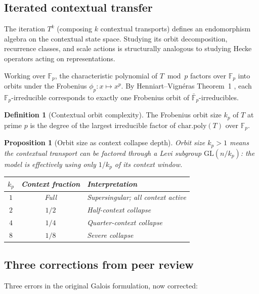 \documentclass[11pt]{amsart}
\newtheorem{proposition}[theorem]{Proposition}
\theoremstyle{definition}
\newtheorem{definition}[theorem]{Definition}
\newcommand{\Fp}{\mathbb{F}_p}
\newcommand{\Fbar}{\bar{\mathbb{F}}_p}
\begin{document}
\subsection{Iterated contextual transfer}

The iteration $T^k$ (composing $k$ contextual transports)
defines an endomorphism algebra on the contextual state space.
Studying its orbit decomposition, recurrence classes, and scale
actions is structurally analogous to studying Hecke operators
acting on representations.

Working over $\Fp$, the characteristic polynomial of $T \bmod p$
factors over $\Fp$ into orbits under the Frobenius $\phi_p: x \mapsto x^p$.
By Henniart--Vign\'eras Theorem~1 \cite{HV17}, each $\Fp$-irreducible
corresponds to exactly one Frobenius orbit of $\Fbar$-irreducibles.

\begin{definition}[Contextual orbit complexity]
The Frobenius orbit size $k_p$ of $T$ at prime $p$ is the
degree of the largest irreducible factor of $\mathrm{char.poly}(T)$ over $\Fp$.
\end{definition}

\begin{proposition}[Orbit size as context collapse depth]
\label{prop:orbit}
Orbit size $k_p > 1$ means the contextual transport can be
factored through a Levi subgroup $\mathrm{GL}(n/k_p)$:
the model is effectively using only $1/k_p$ of its context window.
\begin{center}
\begin{tabular}{@{}ccl@{}}
\toprule
$k_p$ & Context fraction & Interpretation \\
\midrule
$1$ & Full & Supersingular; all context active \\
$2$ & $1/2$ & Half-context collapse \\
$4$ & $1/4$ & Quarter-context collapse \\
$8$ & $1/8$ & Severe collapse \\
\bottomrule
\end{tabular}
\end{center}
\end{proposition}

\subsection{Three corrections from peer review}

Three errors in the original Galois formulation, now corrected:
\end{document}
